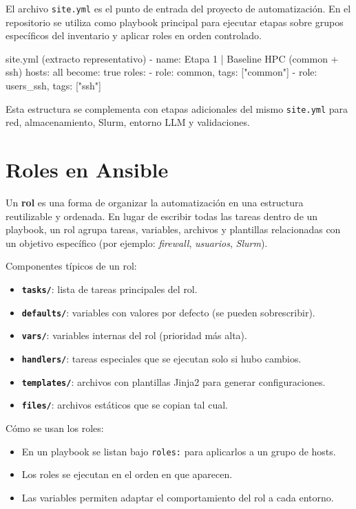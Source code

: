 El archivo \texttt{site.yml} es el punto de entrada del proyecto de automatización. En el repositorio se utiliza como playbook principal para ejecutar etapas sobre grupos específicos del inventario y aplicar roles en orden controlado.

\begin{yamlcode}
site.yml (extracto representativo)
- name: Etapa 1 | Baseline HPC (common + ssh)
  hosts: all
  become: true
  roles:
    - { role: common, tags: ["common"] }
    - { role: users_ssh, tags: ["ssh"] }
\end{yamlcode}

Esta estructura se complementa con etapas adicionales del mismo \texttt{site.yml} para red, almacenamiento, Slurm, entorno LLM y validaciones.


\section{Roles en Ansible}
\label{sec:ansible_roles}

Un \textbf{rol} es una forma de organizar la automatización en una estructura reutilizable y ordenada. En lugar de escribir todas las tareas dentro de un playbook, un rol agrupa tareas, variables, archivos y plantillas relacionadas con un objetivo específico (por ejemplo: \textit{firewall}, \textit{usuarios}, \textit{Slurm}).

Componentes típicos de un rol:
\begin{itemize}
  \item \textbf{\texttt{tasks/}}: lista de tareas principales del rol.
  \item \textbf{\texttt{defaults/}}: variables con valores por defecto (se pueden sobrescribir).
  \item \textbf{\texttt{vars/}}: variables internas del rol (prioridad más alta).
  \item \textbf{\texttt{handlers/}}: tareas especiales que se ejecutan solo si hubo cambios.
  \item \textbf{\texttt{templates/}}: archivos con plantillas Jinja2 para generar configuraciones.
  \item \textbf{\texttt{files/}}: archivos estáticos que se copian tal cual.
\end{itemize}

Cómo se usan los roles:
\begin{itemize}
  \item En un playbook se listan bajo \texttt{roles:} para aplicarlos a un grupo de hosts.
  \item Los roles se ejecutan en el orden en que aparecen.
  \item Las variables permiten adaptar el comportamiento del rol a cada entorno.
\end{itemize}

